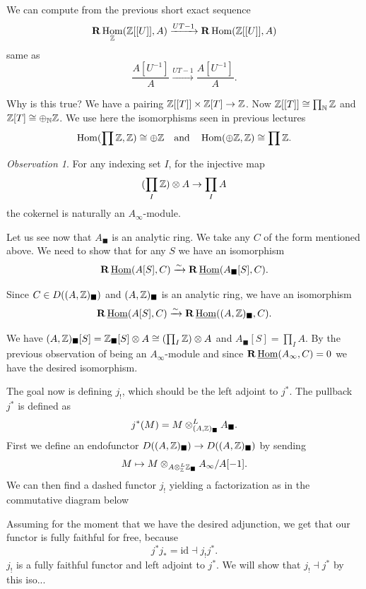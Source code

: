 \documentclass[A4paper, british]{amsart}
\theoremstyle{darkgreentheorem}
\theoremstyle{darkbluedefinition}
\theoremstyle{darkredexample}
\theoremstyle{remark}
\newtheorem{obs}[thm]{Observation}
\DeclareMathOperator{\Hom}{Hom}
\DeclareMathOperator{\ihom}{\underline{Hom}}
\newcommand{\1}{\mathbbm{1}}
\newcommand{\ot}{\otimes}
\newcommand{\op}{\oplus}
\newcommand{\id}{\mathrm{id}}
\newcommand{\usolid}{_{\blacksquare}}
\begin{document}
We can compute from the previous short exact sequence
\[ \bfR\Hom_{\Z}(\Z[[U]],A)\xrightarrow{UT-1}\bfR\Hom(\Z[[U]],A) \]
same as
\[ \frac{A[U^{-1}]}{A}\xrightarrow{UT-1} \frac{A[U^{-1}]}{A}. \]

Why is this true?
We have a pairing $\mathbb{Z}[[T]]\times \mathbb{Z}[T]\to \mathbb{Z}$.
Now $\mathbb{Z}[[T]]\cong \prod_{\mathbb{N}}\mathbb{Z}$ and $\Z[T]\cong \op_{\N} \Z$.
We use here the isomorphisms seen in previous lectures
\[ \Hom(\prod \Z,\Z)\cong \op \Z \quad \text{and}\quad \Hom(\op \Z,\Z)\cong \prod \Z. \]

\begin{obs}
    For any indexing set $I$, for the injective map
    \[ (\prod_{I}\Z)\ot A\to \prod_{I}A \]
    the cokernel is naturally an $A_{\infty}$-module.
\end{obs}

Let us see now that $A\usolid$ is an analytic ring.
We take any $C$ of the form mentioned above.
We need to show that for any $S$ we have an isomorphism
\[ \bfR\ihom(A[S],C)\xrightarrow{\sim}\bfR\ihom(A\usolid[S],C).\]

Since $C\in D((A,\Z)\usolid)$ and $(A,\Z)\usolid$ is an analytic ring, we have an isomorphism
\[ \bfR\ihom(A[S],C)\xrightarrow{\sim} \bfR\ihom((A,\Z)\usolid,C). \]

We have $(A,\Z)\usolid[S]=\Z\usolid[S]\ot A\cong (\prod_{I}\Z)\ot A$ and $A\usolid[S]=\prod_{I}A$.
By the previous observation of being an $A_{\infty}$-module and since $\bfR\ihom(A_{\infty},C)=0$ we have the desired isomorphism.

The goal now is defining $j_{!}$, which should be the left adjoint to $j^{*}$.
The pullback $j^{*}$ is defined as
\[ j^{*}(M)=M\ot_{(A,\Z)\usolid}^{L} A\usolid. \]
First we define an endofunctor $D((A,\Z)\usolid)\to D((A,\Z)\usolid)$ by sending
\[ M\mapsto M\ot_{A\ot_{\Z}^{L}\Z\usolid}A_{\infty}/A [-1]. \] 
We can then find a dashed functor $j_{!}$ yielding a factorization as in the commutative diagram below
\begin{center}
\end{center}

Assuming for the moment that we have the desired adjunction, we get that our functor is fully faithful for free, because
\[ j^{*}j_{*}=\id \dashv j_{!}j^{*}. \]
$j_{!}$ is a fully faithful functor and left adjoint to $j^{*}$.
We will show that $j_{!}\dashv j^{*}$ by this iso...
\end{document}
